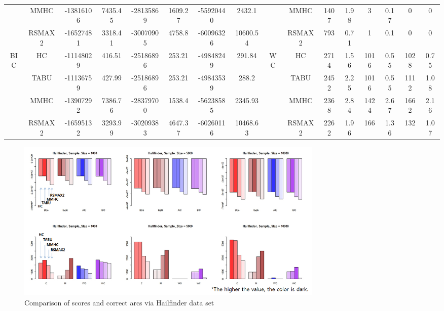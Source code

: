 \begin{table}[p]
{\begin{tabular}{cc||cc|cc|cc||cc|cc|cc|cc}
& MMHC &	-13816106 & 	7435.45 & 	-28135869 & 	1609.27 & 	-55920440 & 	2432.1 & 	& MMHC &	1407 & 	1.98 & 	3 & 	0.17 & 	0 & 	0\tabularnewline													
& RSMAX2 &	-16527481 & 	3318.41 & 	-30070905 & 	4758.8 & 	-60096326 & 	10600.54 & 	& RSMAX2 &	793 & 	0.71 & 	1 & 	0.1 & 	0 & 	0\tabularnewline													
\hline																										
\multirow{4}{*}{BIC} & HC &	-11148029 & 	416.51 & 	-25186896 & 	253.21 & 	-49848249 & 	291.84 & 	\multirow{4}{*}{WC} & HC &	2714 & 	1.56 & 	1016 & 	0.55 & 	1028 & 	0.75\tabularnewline													
& TABU &	-11136759 & 	427.99 & 	-25186896 & 	253.21 & 	-49843539 & 	288.2 & 	& TABU &	2452 & 	2.25 & 	1016 & 	0.55 & 	1112 & 	1.08\tabularnewline													
& MMHC &	-13907292 & 	7386.76 & 	-28379700 & 	1538.4 & 	-56238585 & 	2345.93 & 	& MMHC &	2368 & 	2.84 & 	1424 & 	2.67 & 	1662 & 	2.16\tabularnewline													
& RSMAX2 &	-16595132 & 	3293.99 & 	-30209383 & 	4647.37 & 	-60260116 & 	10468.63 & 	& RSMAX2 &	2262 & 	1.96 & 	166 & 	1.36 & 	132 & 	1.07\tabularnewline													
\hline																										
\end{tabular}																										
}																										
\end{table}

	\begin{figure}[p]
	\centering
		\includegraphics[height=220pt]{images/Real_4_Halifinder}
		\caption{Comparison of scores and correct arcs via Hailfinder data set}
	\end{figure}	
